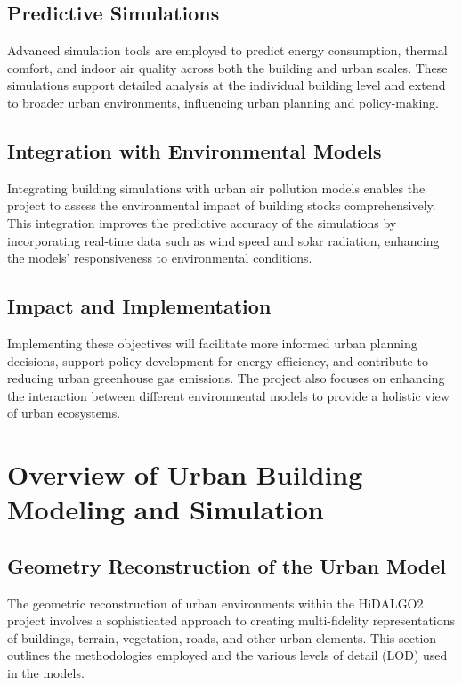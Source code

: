 \documentclass[runningheads]{llncs}
\begin{document}
\subsection{Predictive Simulations}
Advanced simulation tools are employed to predict energy consumption, thermal comfort, and indoor air quality across both the building and urban scales. These simulations support detailed analysis at the individual building level and extend to broader urban environments, influencing urban planning and policy-making.

\subsection{Integration with Environmental Models}
Integrating building simulations with urban air pollution models enables the project to assess the environmental impact of building stocks comprehensively. This integration improves the predictive accuracy of the simulations by incorporating real-time data such as wind speed and solar radiation, enhancing the models' responsiveness to environmental conditions.

\subsection{Impact and Implementation}
Implementing these objectives will facilitate more informed urban planning decisions, support policy development for energy efficiency, and contribute to reducing urban greenhouse gas emissions. The project also focuses on enhancing the interaction between different environmental models to provide a holistic view of urban ecosystems.

\section{Overview of Urban Building Modeling and Simulation}

\subsection{Geometry Reconstruction of the Urban Model}

The geometric reconstruction of urban environments within the HiDALGO2 project involves a sophisticated approach to creating multi-fidelity representations of buildings, terrain, vegetation, roads, and other urban elements. This section outlines the methodologies employed and the various levels of detail (LOD) used in the models.
\end{document}
